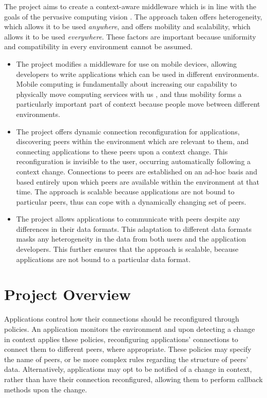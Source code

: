 \documentclass[12pt,twoside,notitlepage]{report}
\begin{document}
The project aims to create a context-aware middleware which is in line with the goals of the pervasive computing vision \cite{weiser1991computer}. 
The approach taken offers heterogeneity, which allows it to be used {\sl anywhere}, and offers mobility and scalability, which allows it to be used {\sl everywhere}. 
These factors are important because uniformity and compatibility in every environment cannot be assumed. 

\begin{itemize}

\item
The project modifies a middleware for use on mobile devices, allowing developers to write applications which can be used in different environments. 
Mobile computing is fundamentally about increasing our capability to physically move computing services with us \cite{lyytinen2002ubiquitous}, and thus mobility forms a particularly important part of context because people move between different environments. 

\item
The project offers dynamic connection reconfiguration for applications, discovering peers within the environment which are relevant to them, and connecting applications to these peers upon a context change. 
This reconfiguration is invisible to the user, occurring automatically following a context change. 
Connections to peers are established on an ad-hoc basis and based entirely upon which peers are available within the environment at that time. 
The approach is scalable because applications are not bound to particular peers, thus can cope with a dynamically changing set of peers. 

\item
The project allows applications to communicate with peers despite any differences in their data formats. 
This adaptation to different data formats masks any heterogeneity in the data \cite{saha2003pervasive} from both users and the application developers. 
This further ensures that the approach is scalable, because applications are not bound to a particular data format. 

\end{itemize}


\section{Project Overview}

Applications control how their connections should be reconfigured through policies. 
An application monitors the environment and upon detecting a change in context applies these policies, reconfiguring applications' connections to connect them to different peers, where appropriate.
These policies may specify the name of peers, or be more complex rules regarding the structure of peers' data. 
Alternatively, applications may opt to be notified of a change in context, rather than have their connection reconfigured, allowing them to perform callback methods upon the change.
\end{document}

